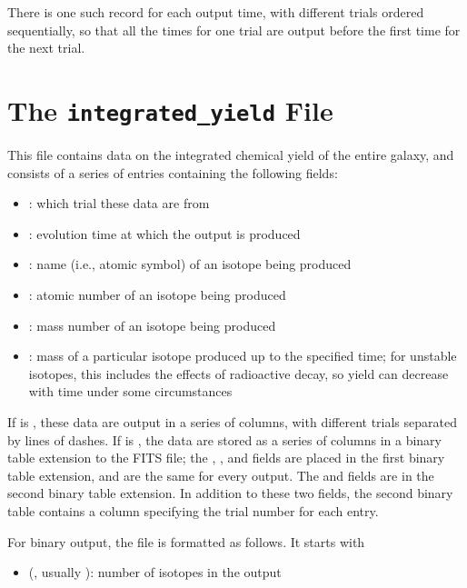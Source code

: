 \documentclass[letterpaper,10pt,english]{sphinxmanual}
\begin{document}
There is one such record for each output time, with different trials ordered sequentially, so that all the times for one trial are output before the first time for the next trial.


\section{The \texttt{integrated\_yield} File}
\label{output:the-integrated-yield-file}\label{output:ssec-int-yield-file}
This file contains data on the integrated chemical yield of the entire
galaxy, and consists of a series of entries containing the following
fields:
\begin{itemize}
\item {} 
: which trial these data are from

\item {} 
: evolution time at which the output is produced

\item {} 
: name (i.e., atomic symbol) of an isotope being produced

\item {} 
: atomic number of an isotope being produced

\item {} 
: mass number of an isotope being produced

\item {} 
: mass of a particular isotope produced up to the specified time; for unstable isotopes, this includes the effects of radioactive decay, so yield can decrease with time under some circumstances

\end{itemize}

If  is , these data are output in a series of
columns, with different trials separated by lines of dashes. If
 is , the data are stored as a series of
columns in a binary table extension to the FITS file; the ,
, and  fields are placed in the first binary table
extension, and are the same for every output. The  and
 fields are in the second binary table extension. In
addition to these two fields, the second binary table contains a
column specifying the trial number for each entry.

For binary output, the file is formatted as follows. It starts with
\begin{itemize}
\item {} 
 (, usually ): number of isotopes in the output

\end{itemize}
\end{document}
